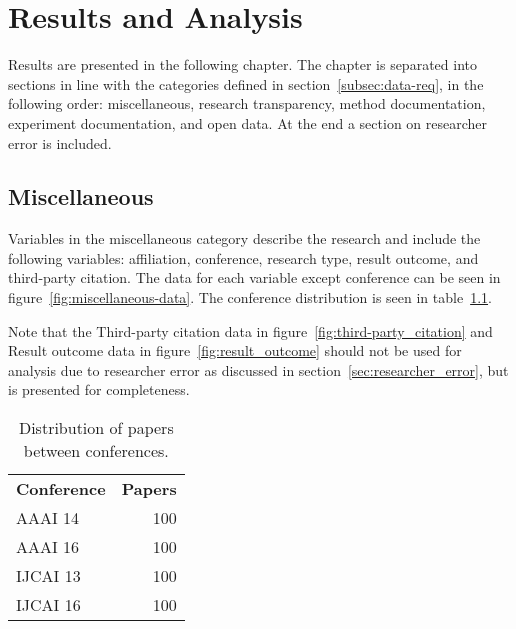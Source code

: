 
\chapter{Results and Analysis}
\label{chap:results}
Results are presented in the following chapter. The chapter is separated into sections in line with the categories defined in section~\ref{subsec:data-req}, in the following order: miscellaneous, research transparency, method documentation, experiment documentation,  and open data. At the end a section on researcher error is included.

\section{Miscellaneous}
Variables in the miscellaneous category describe the research and include the following variables: affiliation, conference, research type, result outcome, and third-party citation.
The data for each variable except conference can be seen in figure~\ref{fig:miscellaneous-data}. The conference distribution is seen in table~\ref{tab:conferences}.

Note that the Third-party citation data in figure~\ref{fig:third-party_citation} and Result outcome data in figure~\ref{fig:result_outcome} should not be used for analysis due to researcher error as discussed in section~\ref{sec:researcher_error}, but is presented for completeness.

\begin{table}[!h]
\begin{center}
    \begin{tabular}{ lr }
    \textbf{Conference} & \textbf{Papers} \\
    AAAI 14 & 100 \\
    AAAI 16 & 100 \\
    IJCAI 13 & 100 \\
    IJCAI 16 & 100 \\
    \end{tabular}
\end{center}
\caption{Distribution of papers between conferences.}
\label{tab:conferences}
\end{table}

